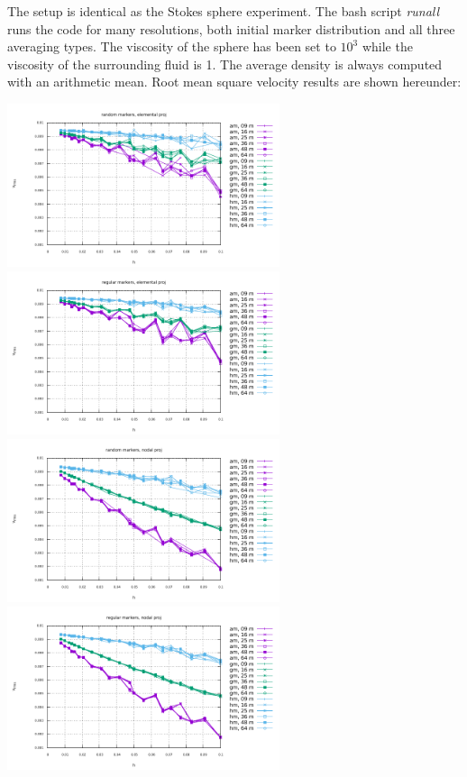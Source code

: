 The setup is identical as the Stokes sphere experiment. The bash script {\sl runall} runs the code for many resolutions,
both initial marker distribution and all three averaging types. The viscosity of the sphere has been 
set to $10^3$ while the viscosity of the surrounding fluid is 1. 
The average density is always computed with an arithmetic mean. 
Root mean square velocity results are shown hereunder:

\begin{center}
\includegraphics[width=8cm]{python_codes/fieldstone_13/vrms_rand_proj1} 
\includegraphics[width=8cm]{python_codes/fieldstone_13/vrms_norand_proj1}\\ 
\includegraphics[width=8cm]{python_codes/fieldstone_13/vrms_rand_proj2} 
\includegraphics[width=8cm]{python_codes/fieldstone_13/vrms_norand_proj2}\\ 

\end{center}
